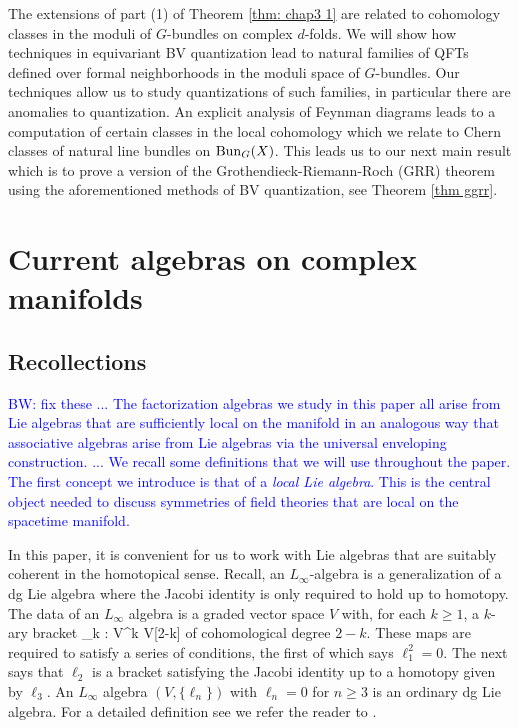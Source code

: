 \documentclass[10pt]{amsart}
\def\brian{\textcolor{blue}{BW: }\textcolor{blue}}
\begin{document}
The extensions of part (1) of Theorem \ref{thm: chap3 1} are related to cohomology classes in the moduli of $G$-bundles on complex $d$-folds.
We will show how techniques in equivariant BV quantization lead to natural families of QFTs defined over formal neighborhoods in the moduli space of $G$-bundles. 
Our techniques allow us to study quantizations of such families, in particular there are anomalies to quantization. 
An explicit analysis of Feynman diagrams leads to a computation of certain classes in the local cohomology which we relate to Chern classes of natural line bundles on ${\rm Bun}_G(X)$.
This leads us to our next main result which is to prove a version of the Grothendieck-Riemann-Roch (GRR) theorem using the aforementioned methods of BV quantization, see Theorem \ref{thm ggrr}.


\section{Current algebras on complex manifolds}

\subsection{Recollections}

\brian{fix these
...
The factorization algebras we study in this paper all arise from Lie algebras that are sufficiently local on the manifold in an analogous way that associative algebras arise from Lie algebras via the universal enveloping construction.
...
We recall some definitions that we will use throughout the paper.
The first concept we introduce is that of a {\em local Lie algebra}. 
This is the central object needed to discuss symmetries of field theories that are local on the spacetime manifold. 
}

In this paper, it is convenient for us to work with Lie algebras that are suitably coherent in the homotopical sense.
Recall, an $L_\infty$-algebra is a generalization of a dg Lie algebra where the Jacobi identity is only required to hold up to homotopy.
The data of an $L_\infty$ algebra is a graded vector space $V$ with, for each $k \geq 1$, a $k$-ary bracket
\ben
\ell_k : V^{\tensor k} \to V[2-k]
\een
of cohomological degree $2-k$. 
These maps are required to satisfy a series of conditions, the first of which says $\ell_1^2 = 0$.
The next says that $\ell_2$ is a bracket satisfying the Jacobi identity up to a homotopy given by $\ell_3$.
An $L_\infty$ algebra $(V, \{\ell_n\})$ with $\ell_n = 0$ for $n \geq 3$ is an ordinary dg Lie algebra.
For a detailed definition see we refer the reader to \cite{StasheffDG, GetzlerLie}.
\end{document}
